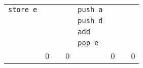 \documentclass{article}
\begin{document}
\begin{tabular}{l|ll|ll|ll|l|}
\multicolumn{1}{|l|}{\texttt{store e}} & & \multicolumn{1}{|l|}{} & & \multicolumn{1}{|l|}{\texttt{push a}} & & \multicolumn{1}{|l|}{} & \\
\multicolumn{1}{|l|}{} & & \multicolumn{1}{|l|}{} & & \multicolumn{1}{|l|}{\texttt{push d}} & & \multicolumn{1}{|l|}{} & \\ 
\multicolumn{1}{|l|}{} & & \multicolumn{1}{|l|}{} & & \multicolumn{1}{|l|}{\texttt{add}} & & \multicolumn{1}{|l|}{} &\\
\multicolumn{1}{|l|}{} & & \multicolumn{1}{|l|}{} & & \multicolumn{1}{|l|}{\texttt{pop e}} & & \multicolumn{1}{|l|}{} &\\
\hline
 & \multicolumn{1}{|l|}{0} & & \multicolumn{1}{|l|}{0} & & \multicolumn{1}{|l|}{0} & & \multicolumn{1}{|l|}{0} \\
 \cline{2-2}\cline{4-4}\cline{6-6}\cline{8-8}
\end{tabular}
\section{}
\end{document}
